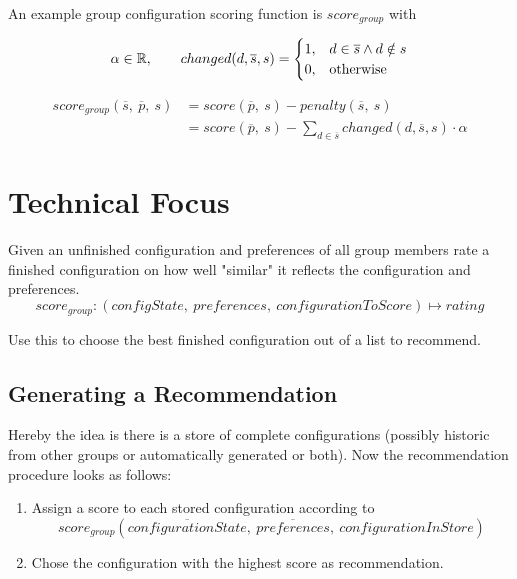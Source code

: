 \documentclass{article}
\begin{document}
An example group configuration scoring function is $score_{group}$ with

\begin{equation}
    \notag \alpha \in \mathbb{R}, \qquad     changed(d,\overline{s}, s) = 
    \begin{cases}
      1, & d \in \overline{s} \land d \notin s \\
      0, & \text{otherwise}
    \end{cases}
\end{equation}

\begin{equation}
    \begin{split}
        score_{group}(\overline{s},\ \overline{p},\ s)
        & = score(\overline{p},\ s) - penalty(\overline{s},\ s) \\
        & = score(\overline{p},\ s) - \sum_{d \in \overline{s}} changed(d,\overline{s}, s) \cdot \alpha
    \end{split}
\end{equation}


\section{Technical Focus}

Given an unfinished configuration and preferences of all group members rate a finished configuration on how well "similar" it reflects the configuration and preferences.
$$score_{group} : (configState,\ preferences,\ configurationToScore) \mapsto rating$$

Use this to choose the best finished configuration out of a list to recommend.

\subsection{Generating a Recommendation}

Hereby the idea is there is a store of complete configurations (possibly historic from other groups or automatically generated or both).
Now the recommendation procedure looks as follows:

\begin{enumerate}
    \item Assign a score to each stored configuration according to $$score_{group}(\overline{configurationState},\ \overline{preferences}, \ configurationInStore)$$
    \item Chose the configuration with the highest score as recommendation.
\end{enumerate}
\end{document}
